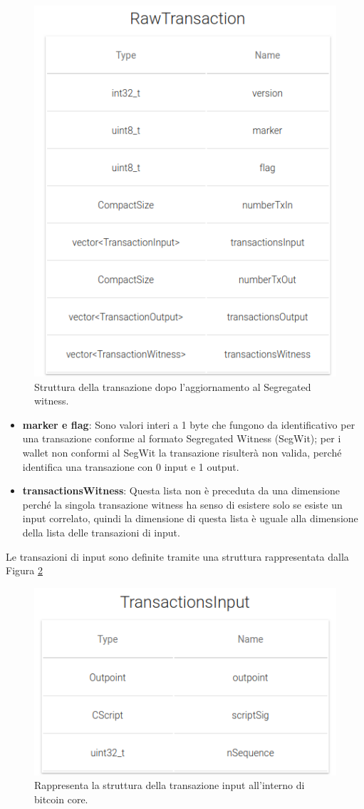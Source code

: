 \begin{figure}[h]
\begin{center}
\includegraphics[width=0.6\columnwidth]{images/bitcoinstructs/raw_tx.png}
\end{center}
\caption{Struttura della transazione dopo l’aggiornamento al Segregated witness.}
\label{fig:rawtxbitcoinc}
\end{figure}

\begin{itemize}
  \item {\bf marker e flag\/}: Sono valori interi a 1 byte che fungono da identificativo per una transazione conforme al formato Segregated Witness (SegWit); per i wallet non conformi al SegWit la transazione risulterà non valida, perché identifica una transazione con 0 input e 1 output.
  \item {\bf transactionsWitness\/}: Questa lista non è preceduta da una dimensione perché la singola transazione witness ha senso di esistere solo se esiste un input correlato, quindi la dimensione di questa lista è uguale alla dimensione della lista delle transazioni di input.
\end{itemize}

Le transazioni di input sono definite tramite una struttura rappresentata dalla Figura \ref{fig:inputtxbitcoinc}

\begin{figure}[H]
\begin{center}
\includegraphics[width=0.6\columnwidth]{images/bitcoinstructs/input_tx.png}
\end{center}
\caption{Rappresenta la struttura della transazione input all’interno di bitcoin core.}
\label{fig:inputtxbitcoinc}
\end{figure}

